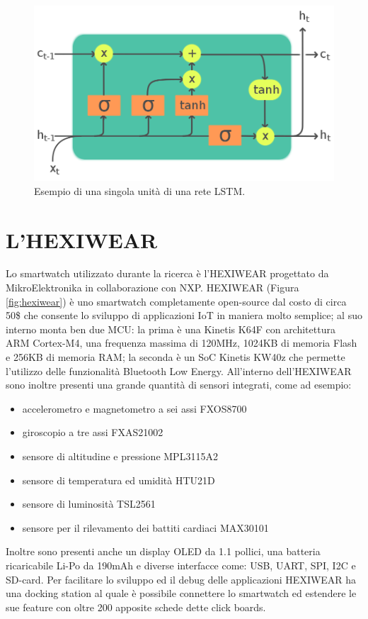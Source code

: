 \begin{figure}[!htb]
    \centering
    \includegraphics[width=.5\textwidth]{figure/lstm.png}
    \caption{Esempio di una singola unità di una rete LSTM.}
    \label{fig:lstm}
\end{figure}

\section{L'HEXIWEAR}
\label{sec:hexiwear}

Lo smartwatch utilizzato durante la ricerca è l’HEXIWEAR progettato da MikroElektronika in collaborazione con NXP. HEXIWEAR (Figura \ref{fig:hexiwear}) è uno smartwatch completamente open-source dal costo di circa 50\$ che consente lo sviluppo di applicazioni IoT in maniera molto semplice; al suo interno monta ben due MCU: la prima è una Kinetis K64F con architettura ARM Cortex-M4, una frequenza massima di 120MHz, 1024KB di memoria Flash e 256KB di memoria RAM; la seconda è un SoC Kinetis KW40z che permette l’utilizzo delle funzionalità Bluetooth Low Energy. 
All'interno dell'HEXIWEAR sono inoltre presenti una grande quantità di sensori integrati, come ad esempio: 

\begin{itemize}
    \item accelerometro e magnetometro a sei assi FXOS8700
    \item giroscopio a tre assi FXAS21002
    \item sensore di altitudine e pressione MPL3115A2
    \item sensore di temperatura ed umidità HTU21D
    \item sensore di luminosità TSL2561
    \item sensore per il rilevamento dei battiti cardiaci MAX30101
\end{itemize}

Inoltre sono presenti anche un display OLED da 1.1 pollici, una batteria ricaricabile Li-Po da 190mAh e diverse interfacce come: USB, UART, SPI, I2C e SD-card.
Per facilitare lo sviluppo ed il debug delle applicazioni HEXIWEAR ha una docking station al quale è possibile connettere lo smartwatch ed estendere le sue feature con oltre 200 apposite schede dette click boards.

